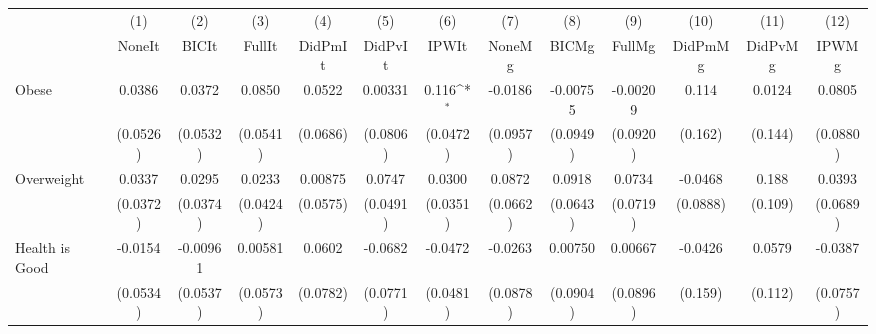 {
\def\sym#1{\ifmmode^{#1}\else\(^{#1}\)\fi}
\begin{tabular}{l*{12}{c}}
\toprule
            &\multicolumn{1}{c}{(1)}&\multicolumn{1}{c}{(2)}&\multicolumn{1}{c}{(3)}&\multicolumn{1}{c}{(4)}&\multicolumn{1}{c}{(5)}&\multicolumn{1}{c}{(6)}&\multicolumn{1}{c}{(7)}&\multicolumn{1}{c}{(8)}&\multicolumn{1}{c}{(9)}&\multicolumn{1}{c}{(10)}&\multicolumn{1}{c}{(11)}&\multicolumn{1}{c}{(12)}\\
            &\multicolumn{1}{c}{NoneIt}&\multicolumn{1}{c}{BICIt}&\multicolumn{1}{c}{FullIt}&\multicolumn{1}{c}{DidPmIt}&\multicolumn{1}{c}{DidPvIt}&\multicolumn{1}{c}{IPWIt}&\multicolumn{1}{c}{NoneMg}&\multicolumn{1}{c}{BICMg}&\multicolumn{1}{c}{FullMg}&\multicolumn{1}{c}{DidPmMg}&\multicolumn{1}{c}{DidPvMg}&\multicolumn{1}{c}{IPWMg}\\
\midrule
Obese       &      0.0386         &      0.0372         &      0.0850         &      0.0522         &     0.00331         &       0.116\sym{*}  &     -0.0186         &    -0.00755         &    -0.00209         &       0.114         &      0.0124         &      0.0805         \\
            &    (0.0526)         &    (0.0532)         &    (0.0541)         &    (0.0686)         &    (0.0806)         &    (0.0472)         &    (0.0957)         &    (0.0949)         &    (0.0920)         &     (0.162)         &     (0.144)         &    (0.0880)         \\
\addlinespace
Overweight  &      0.0337         &      0.0295         &      0.0233         &     0.00875         &      0.0747         &      0.0300         &      0.0872         &      0.0918         &      0.0734         &     -0.0468         &       0.188         &      0.0393         \\
            &    (0.0372)         &    (0.0374)         &    (0.0424)         &    (0.0575)         &    (0.0491)         &    (0.0351)         &    (0.0662)         &    (0.0643)         &    (0.0719)         &    (0.0888)         &     (0.109)         &    (0.0689)         \\
\addlinespace
Health is Good&     -0.0154         &    -0.00961         &     0.00581         &      0.0602         &     -0.0682         &     -0.0472         &     -0.0263         &     0.00750         &     0.00667         &     -0.0426         &      0.0579         &     -0.0387         \\
            &    (0.0534)         &    (0.0537)         &    (0.0573)         &    (0.0782)         &    (0.0771)         &    (0.0481)         &    (0.0878)         &    (0.0904)         &    (0.0896)         &     (0.159)         &     (0.112)         &    (0.0757)         \\

\end{tabular}}
